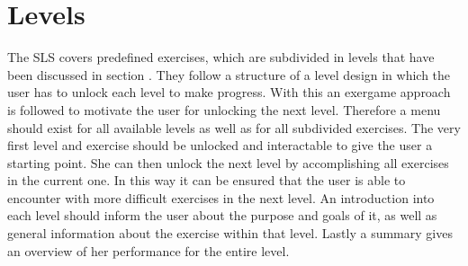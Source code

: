 \section{Levels}\label{4_3_stages}
The SLS covers predefined exercises, which are subdivided in levels that have been discussed in section \textit{}. They follow a structure of a level design in which the user has to unlock each level to make progress. With this an exergame approach is followed to motivate the user for unlocking the next level. Therefore a menu should exist for all available levels as well as for all subdivided exercises. The very first level and exercise should be unlocked and interactable to give the user a starting point. She can then unlock the next level by accomplishing all exercises in the current one. In this way it can be ensured that the user is able to encounter with more difficult exercises in the next level. An introduction into each level should inform the user about the purpose and goals of it, as well as general information about the exercise within that level. Lastly a summary gives an overview of her performance for the entire level.

